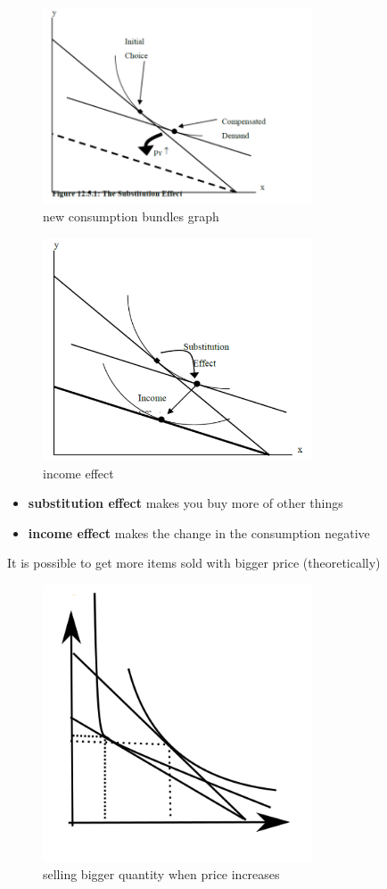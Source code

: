 \documentclass[12pt, a4paper, titlepage]{extarticle}
\begin{document}
	\begin{figure}[htp]
	\centering
	    \includegraphics[width=8cm]{utility.png}
	    \caption{new consumption bundles graph\label{fig:utility}}
	\end{figure}
	\begin{figure}[htp]
	\centering
	    \includegraphics[width=8cm]{substitution_effect.png}
	    \caption{income effect\label{fig:substitution_effect}}
	\end{figure}
	\begin{itemize}
	\item{\textbf{substitution effect} makes you buy more of other things}
	\item{\textbf{income effect} makes the change in the consumption negative}
	\end{itemize}
	It is possible to get more items sold with bigger price (theoretically)\\
	\begin{figure}[htp]
	\centering
	    \includegraphics[width=8cm]{price_increase_quantity_increase.png}
	    \caption{selling bigger quantity when price increases\label{fig:pricequantum}}
	\end{figure}
	
\end{document}
